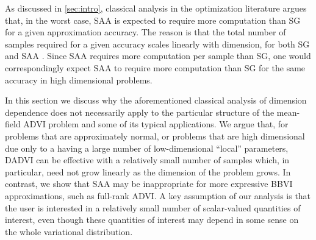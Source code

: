 As discussed in \cref{sec:intro}, classical analysis in the optimization
literature argues that, in the worst case, SAA is expected to require more
computation than SG for a given approximation accuracy.  The reason is that the
total number of samples required for a given accuracy scales linearly with
dimension, for both SG and SAA \citep[][Chapter
5]{nemirovski:2009:sgdvsfixed,shapiro:2021:lectures}. Since SAA requires more
computation per sample than SG, one would correspondingly expect SAA to require
more computation than SG for the same accuracy in high dimensional problems.

In this section we discuss why the aforementioned classical analysis of
dimension dependence does not necessarily apply to the particular structure of
the mean-field ADVI problem and some of its typical applications.  We argue
that, for problems that are approximately normal, or problems that are high
dimensional due only to a having a large number of low-dimensional ``local''
parameters, DADVI can be effective with a relatively small number of samples
which, in particular, need not grow linearly as the dimension of the problem
grows.  In contrast, we show that SAA may be inappropriate for more expressive
BBVI approximations, such as full-rank ADVI. A key assumption of our analysis is
that the user is interested in a relatively small number of scalar-valued
quantities of interest, even though these quantities of interest may depend in
some sense on the whole variational distribution.
